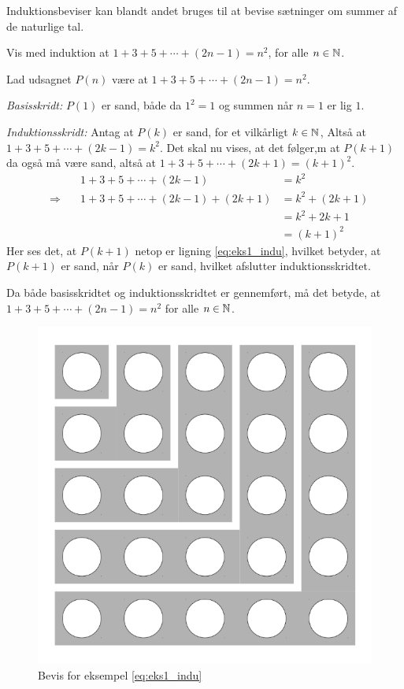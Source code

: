 Induktionsbeviser kan blandt andet bruges til at bevise sætninger om summer af de naturlige tal.
\begin{exmp}
	Vis med induktion at $1 + 3 + 5 + \dotsb + (2n-1) = n^2$, for alle $n \in \mathbb{N}$.

	Lad udsagnet $P(n)$ være at $1 + 3 + 5 + \dotsb + (2n-1) = n^2$.
	
	\textit{Basisskridt:} $P(1)$ er sand, både da $1^2 = 1$ og summen når $n = 1$ er lig $1$.

	\textit{Induktionsskridt:} Antag at $P(k)$ er sand, for et vilkårligt $k \in \mathbb{N}$, Altså at $1 + 3 + 5 + \dotsb + (2k-1) = k^2$.
	Det skal nu vises, at det følger,m at $P(k + 1)$ da også må være sand, altså at $1 + 3 + 5 + \dotsb + (2k+1) = \left( k + 1 \right) ^2$.
	\begin{align}
		&&1 + 3 + 5 + \dotsb + (2k-1) 
		&= k^2 \nonumber \\
		&\Rightarrow \quad
		&1 + 3 + 5 + \dotsb + (2k-1) + (2k+1) 
		&= k^2 + (2k + 1) \nonumber \\
		&&&= k^2 + 2k + 1 \nonumber \\
		&&&= \left( k + 1 \right) ^2 \label{eq:eks1_indu}
	\end{align}
	Her ses det, at $P(k + 1)$ netop er ligning \eqref{eq:eks1_indu}, hvilket betyder, at $P(k + 1)$ er sand, når $P(k)$ er sand, hvilket afslutter induktionsskridtet.

	Da både basisskridtet og induktionsskridtet er gennemført, må det betyde, at $1 + 3 + 5 + \dotsb + (2n-1) = n^2$ for alle $n \in \mathbb{N}$.
\end{exmp}

\begin{figure}
	\begin{center}
		\includegraphics[scale=0.2]{fig/img/sum_of_n_first_odd_integers.png}
	\end{center}
	\caption{Bevis for eksempel \ref{eq:eks1_indu}} \label{fig1_indu}
\end{figure}

